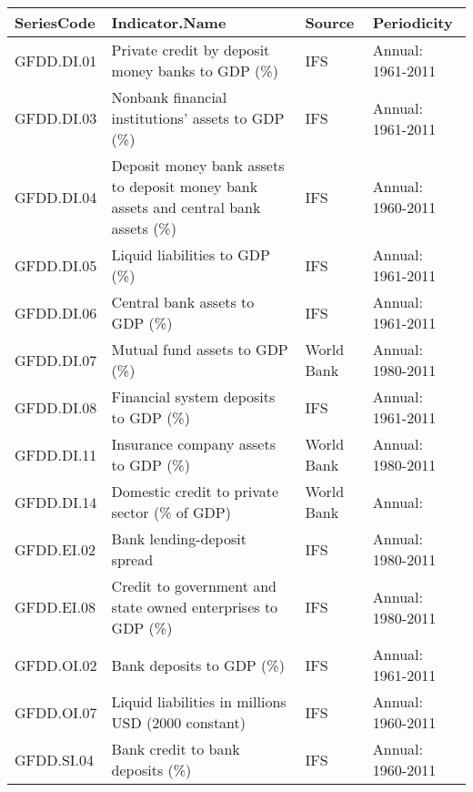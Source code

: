 \begin{tabular}{llll}
  \hline
SeriesCode & Indicator.Name & Source & Periodicity \\ 
  \hline
GFDD.DI.01 & Private credit by deposit money banks to GDP (\%) & IFS & Annual: 1961-2011 \\ 
GFDD.DI.03 & Nonbank financial institutions' assets to GDP (\%) & IFS & Annual: 1961-2011 \\ 
GFDD.DI.04 & Deposit money bank assets to deposit money bank assets and central bank assets (\%) & IFS & Annual: 1960-2011 \\ 
GFDD.DI.05 & Liquid liabilities to GDP (\%) & IFS & Annual: 1961-2011 \\ 
GFDD.DI.06 & Central bank assets to GDP (\%) & IFS & Annual: 1961-2011 \\ 
GFDD.DI.07 & Mutual fund assets to GDP (\%) & World Bank & Annual: 1980-2011 \\ 
GFDD.DI.08 & Financial system deposits to GDP (\%) & IFS & Annual: 1961-2011 \\ 
GFDD.DI.11 & Insurance company assets to GDP (\%) & World Bank & Annual: 1980-2011 \\ 
GFDD.DI.14 & Domestic credit to private sector (\% of GDP) & World Bank & Annual: \\ 
 GFDD.EI.02 & Bank lending-deposit spread & IFS & Annual: 1980-2011 \\ 
GFDD.EI.08 & Credit to government and state owned enterprises to GDP (\%) & IFS & Annual: 1980-2011 \\ 
GFDD.OI.02 & Bank deposits to GDP (\%) & IFS & Annual: 1961-2011 \\ 
GFDD.OI.07 & Liquid liabilities in millions USD (2000 constant) & IFS & Annual: 1960-2011 \\ 
GFDD.SI.04 & Bank credit to bank deposits (\%) & IFS & Annual: 1960-2011 \\ 
   \hline
\end{tabular}
